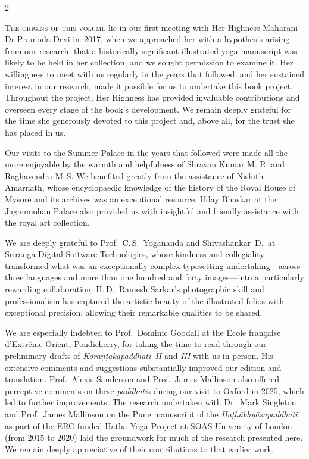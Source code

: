\begin{eng}
\centerline{}
\end{eng}
\vskip 18pt

\begin{nohyp}
\begin{multicols*}{2}
\begin{eng}
\noindent
\lettrine[lines=3,lhang=0.04,nindent=0em]{T}{he origins of this volume} lie in our first meeting with Her Highness
Maharani Dr Pramoda Devi in~2017, when we approached her with a
hypothesis arising from our research: that a historically significant
illustrated yoga manuscript was likely to be held in her collection, and
we sought permission to examine it. Her willingness to meet with us
regularly in the years that followed, and her sustained interest in our
research, made it possible for us to undertake this book project.
Throughout the project, Her Highness has provided invaluable
contributions and overseen every stage of the book's development. We
remain deeply grateful for the time she generously devoted to this
project and, above all, for the trust she has placed in us.

Our visits to the Summer Palace in the years that followed were made all
the more enjoyable by the warmth and helpfulness of Shravan Kumar M. R.
and Raghavendra M.\,S. We benefited greatly from the assistance of
Nishith Amarnath, whose encyclopaedic knowledge of the history of the
Royal House of Mysore and its archives was an exceptional resource. Uday
Bhaskar at the Jaganmohan Palace also provided us with insightful and
friendly assistance with the royal art collection.

We are deeply grateful to Prof.\ C.\,S.\ Yogananda and Shivashankar~D.\ at
Sriranga Digital Software Technologies, whose kindness and collegiality
transformed what was an exceptionally complex typesetting
undertaking---across three languages and more than one hundred and forty
images---into a particularly rewarding collaboration. H.\,D.\ Ramesh
Sarkar's photographic skill and professionalism has captured the
artistic beauty of the illustrated folios with exceptional precision,
allowing their remarkable qualities to be shared.

We are especially indebted to Prof.~Dominic Goodall at the École
française d'Extrême-Orient, Pondicherry, for taking the time to read
through our preliminary drafts of \emph{Koraṇṭakapaddhati~II} and
\emph{III} with us in person. His extensive comments and suggestions
substantially improved our edition and translation. Prof.~Alexis
Sanderson and Prof.~James Mallinson also offered perceptive comments on
these \emph{paddhati}s during our visit to Oxford in 2025, which led to
further improvements. The research undertaken with Dr.~Mark Singleton
and Prof.~James Mallinson on the Pune manuscript of the
\emph{Haṭhābhyāsapaddhati} as part of the ERC-funded Haṭha Yoga Project
at SOAS University of London (from 2015 to 2020) laid the groundwork for
much of the research presented here. We remain deeply appreciative of
their contributions to that earlier work.


\end{eng}
\end{multicols*}
\end{nohyp}
